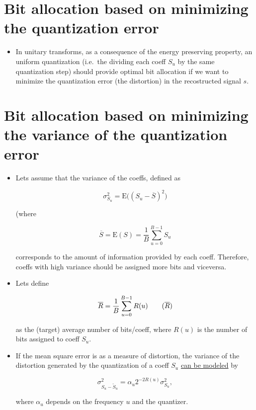 \section{Bit allocation based on minimizing the quantization error}
\begin{itemize}
\tightlist
\item
  In unitary transforms, as a consequence of the energy preserving
  property, an uniform quantization (i.e.~the dividing each coeff
  \(S_u\) by the same quantization step) should provide optimal bit
  allocation if we want to minimize the quantization error (the
  distortion) in the recostructed signal \(s\).
\end{itemize}

\section{Bit allocation based on minimizing the variance of the quantization error}
\begin{itemize}
\item
  Lets assume that the variance of the coeffs, defined as

  \begin{equation}
    \sigma_{S_u}^2 = \text{E}\big( (S_u - \overline{S})^2\big)
   \end{equation}

  (where

  \begin{equation}
     \overline{S} = \text{E}(S) = \frac{1}{B}\sum_{u=0}^{B-1} S_u
   \end{equation}

  corresponds to the amount of information provided by each coeff.
  Therefore, coeffs with high variance should be assigned more bits and
  viceversa.
\item
  Lets define

  \begin{equation}
    {\overline{R}} = \frac{1}{B}\sum_{u=0}^{B-1}R(u)
    \tag{$\overline{R}$}
  \end{equation}

  as the (target) average number of bits/coeff, where \(R(u)\) is the
  number of bits assigned to coeff \(S_u\).
\item
  If the mean square error is as a measure of distortion, the variance
  of the distortion generated by the quantization of a coeff \(S_u\)
  \href{http://cdn.intechopen.com/pdfs/16267/InTech-Rate_control_in_video_coding.pdf}{can
  be modeled} by

  \begin{equation}
    \sigma_{S_u-\tilde{S}_u}^2=\alpha_{u}2^{-2R(u)}\sigma_{S_u}^2,
  \end{equation}

  where \(\alpha_{u}\) depends on the frequency \(u\) and the quantizer.
\end{itemize}

